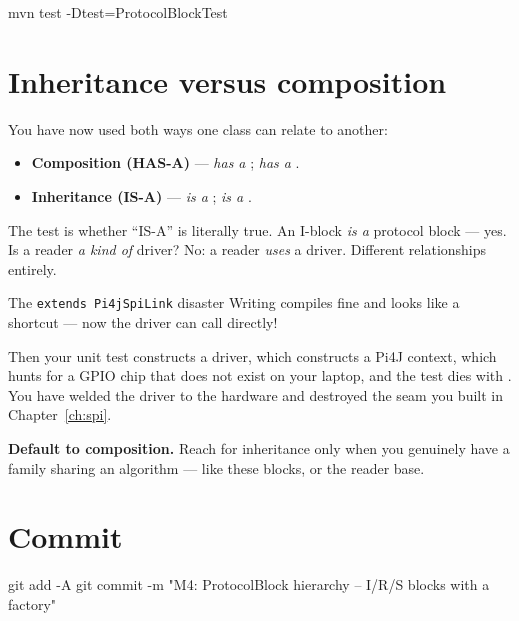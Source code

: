 \begin{verifybox}
\begin{shell}
mvn test -Dtest=ProtocolBlockTest
\end{shell}
\end{verifybox}

\section{Inheritance versus composition}

You have now used both ways one class can relate to another:

\begin{itemize}
  \item \textbf{Composition (HAS-A)} ---  \emph{has a}
        ;  \emph{has a} .
  \item \textbf{Inheritance (IS-A)} ---  \emph{is a}
        ;  \emph{is a}
        .
\end{itemize}

The test is whether ``IS-A'' is literally true. An I-block \emph{is a} protocol
block --- yes. Is a reader \emph{a kind of} driver? No: a reader \emph{uses} a
driver. Different relationships entirely.

\begin{trap}{The \texttt{extends Pi4jSpiLink} disaster}
Writing  compiles fine and looks
like a shortcut --- now the driver can call  directly!

Then your unit test constructs a driver, which constructs a Pi4J context, which
hunts for a GPIO chip that does not exist on your laptop, and the test dies with
. You have welded the driver to the hardware and
destroyed the seam you built in Chapter~\ref{ch:spi}.

\textbf{Default to composition.} Reach for inheritance only when you genuinely
have a family sharing an algorithm --- like these blocks, or the reader base.
\end{trap}

\section{Commit}

\begin{shell}
git add -A
git commit -m "M4: ProtocolBlock hierarchy -- I/R/S blocks with a factory"
\end{shell}
